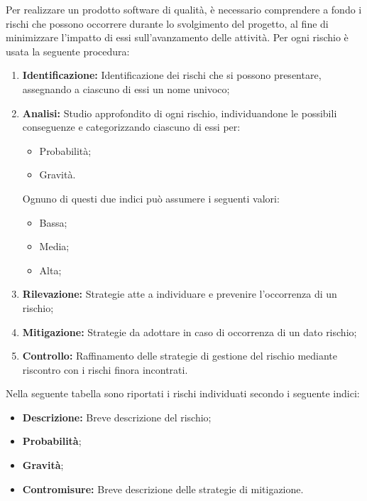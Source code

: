 Per realizzare un prodotto software di {qualità}, è necessario
comprendere a fondo i rischi che possono occorrere durante lo svolgimento
del progetto, al fine di minimizzare l'impatto di essi sull'avanzamento
delle {attività}. \newline
Per ogni rischio è usata la seguente procedura:
\begin{enumerate}
    \item \textbf{Identificazione: }
           Identificazione dei rischi che si possono presentare, assegnando a ciascuno di essi un nome univoco;
    \item \textbf{Analisi: } Studio approfondito di ogni rischio, individuandone le possibili conseguenze e categorizzando ciascuno di essi per:
           \begin{itemize}
               \item Probabilità;
               \item Gravità.
           \end{itemize}
           Ognuno di questi due indici può assumere i seguenti valori:
           \begin{itemize}
               \item Bassa;
               \item Media;
               \item Alta;
           \end{itemize}
    \item \textbf{Rilevazione: }Strategie atte a individuare e prevenire l'occorrenza di un rischio;
    \item \textbf{Mitigazione: }Strategie da adottare in caso di occorrenza di un dato rischio;
    \item \textbf{Controllo: }Raffinamento delle strategie di gestione del rischio mediante riscontro con i rischi
                              finora incontrati.
\end{enumerate}                         
Nella seguente tabella sono riportati i rischi individuati secondo i seguente indici:
\begin{itemize}
	\item \textbf{Descrizione: }Breve descrizione del rischio; 
	\item \textbf{Probabilità};
    \item \textbf{Gravità};
    \item \textbf{Contromisure: }Breve descrizione delle strategie di mitigazione.

\end{itemize}

